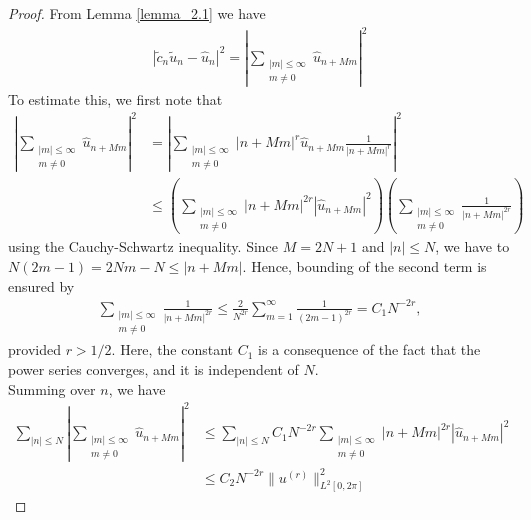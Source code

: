 	\begin{proof}
    From Lemma \ref{lemma_2.1} we have
    \begin{align*}
        |\widetilde{c}_n \widetilde{u}_n - \hat{u}_n|^2 = \displaystyle \left|\sum_{\substack{|m|\leq \infty \\ m \neq 0}} \hat{u}_{n + Mm} \right|^2
    \end{align*}
    To estimate this, we first note that
    \begin{align*}
        \displaystyle \left|\sum_{\substack{|m|\leq \infty \\ m \neq 0}} \hat{u}_{n + Mm} \right|^2 &= \left|\sum_{\substack{|m|\leq \infty \\ m \neq 0}} |n + Mm|^r \hat{u}_{n + Mm} \frac{1}{|n + Mm|^r} \right|^2 \\ 
        &\leq \left(\sum_{\substack{|m|\leq \infty \\ m \neq 0}} |n + Mm|^{2r} |\hat{u}_{n + Mm}|^2 \right) \left(\sum_{\substack{|m|\leq \infty \\ m \neq 0}} \frac{1}{|n + Mm|^{2r}}  \right)
    \end{align*}
    using the Cauchy-Schwartz inequality. Since $M =2N + 1$ and  $|n| \leq N$, we have to $N(2m - 1) = 2Nm - N \leq |n + Mm|$. Hence, bounding of the second term is ensured by
    \begin{align*}
        \displaystyle \sum_{\substack{|m|\leq \infty \\ m \neq 0}} \frac{1}{|n + Mm|^{2r}} \leq \frac{2}{N^{2r}} \sum^{\infty}_{m=1} \frac{1}{(2m - 1)^{2r}} = C_1 N^{-2r},
    \end{align*}
    provided $r > 1/2$. Here, the constant $C_1$ is a consequence of the fact that the power series converges, and it is independent of $N$.\\
    Summing over $n$, we have
    \begin{align*}
        \displaystyle \sum_{|n|\leq N} \left|\sum_{\substack{|m|\leq \infty \\ m \neq 0}} \hat{u}_{n + Mm} \right|^2 &\leq \sum_{|n| \leq N} C_1 N^{-2r} \sum_{\substack{|m|\leq \infty \\ m \neq 0}} |n + Mm|^{2r} |\hat{u}_{n + Mm}|^2 \\
        &\leq C_2 N^{-2r} \| u^{(r)} \|^2_{L^2[0, 2\pi]}
    \end{align*}
	\end{proof}

